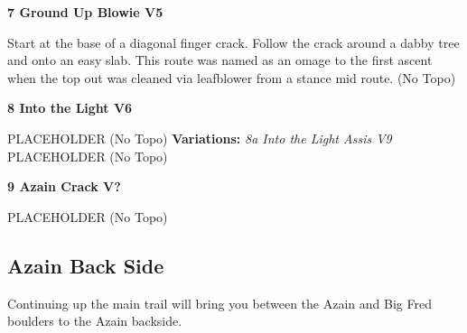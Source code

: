 \begin{multicols*}{2}
\label{pt:Ground up Blowie}
					\label{rt:Ground Up Blowie} \colorbox{RoyalBlue!20}{\textbf{7 Ground Up Blowie V5 \ding{72}   }}
					\begin{adjustwidth}{1cm}{}
					Start at the base of a diagonal finger crack. Follow the crack around a dabby tree and onto an easy slab. This route was named as an omage to the first ascent when the top out was cleaned via leafblower from a stance mid route.
						\newline (No Topo) 
					\end{adjustwidth}
					\label{rt:Into the Light} \colorbox{RoyalBlue!20}{\textbf{8 Into the Light V6  }}
					\begin{adjustwidth}{1cm}{}
					PLACEHOLDER
						\newline (No Topo) 
					\newline \textbf{Variations:} \newline
						\label{vr:Into the Light Assis} \colorbox{Goldenrod!50}{\emph{8a Into the Light Assis V9  }}
						PLACEHOLDER
							\newline (No Topo) 
					\end{adjustwidth}
					\label{rt:Azain Crack} \colorbox{black!20}{\textbf{9 Azain Crack V?  }}
					\begin{adjustwidth}{1cm}{}
					PLACEHOLDER
						\newline (No Topo) 
					\end{adjustwidth}
			\subsection*{Azain Back Side}\label{bf:Azain Back Side}
			Continuing up the main trail will bring you between the Azain and Big Fred boulders to the Azain backside.
			


\end{multicols*}
